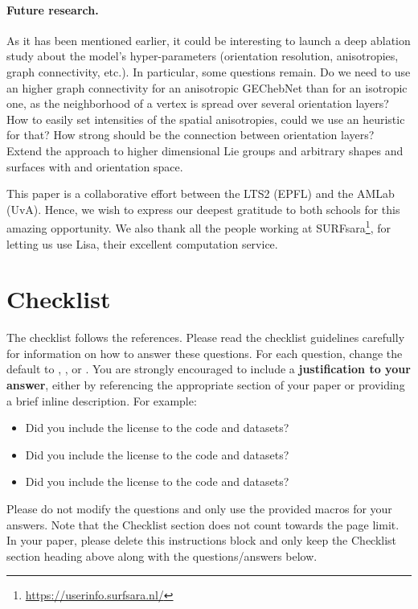 \documentclass{article}
\newcommand{\haguettaz}[1]{{\color[rgb]{.8,.3,.2}{#1}}}
\begin{document}
\paragraph{Future research.} As it has been mentioned earlier, it could be interesting to launch a deep ablation study about the model's hyper-parameters (orientation resolution, anisotropies, graph connectivity, etc.). In particular, some questions remain. Do we need to use an higher graph connectivity for an anisotropic GEChebNet than for an isotropic one, as the neighborhood of a vertex is spread over several orientation layers? How to easily set intensities of the spatial anisotropies, could we use an heuristic for that? How strong should be the connection between orientation layers? Extend the approach to higher dimensional Lie groups and arbitrary shapes and surfaces with and orientation space.

\haguettaz{convergence of graph laplacian to anisotropic Laplace Beltrami operator?}


\begin{ack}
This paper is a collaborative effort between the LTS2 (EPFL) and the AMLab (UvA). Hence, we wish to express our deepest gratitude to both schools for this amazing opportunity. We also thank all the people working at SURFsara\footnote{\url{https://userinfo.surfsara.nl/}}, for letting us use Lisa, their excellent computation service. 
\end{ack}

\clearpage



\clearpage
\section*{Checklist}

The checklist follows the references.  Please
read the checklist guidelines carefully for information on how to answer these
questions.  For each question, change the default \answerTODO{} to \answerYes{},
\answerNo{}, or \answerNA{}.  You are strongly encouraged to include a {\bf
justification to your answer}, either by referencing the appropriate section of
your paper or providing a brief inline description.  For example:
\begin{itemize}
  \item Did you include the license to the code and datasets? 
  \item Did you include the license to the code and datasets? 
  \item Did you include the license to the code and datasets? \answerNA{}
\end{itemize}
Please do not modify the questions and only use the provided macros for your
answers.  Note that the Checklist section does not count towards the page
limit.  In your paper, please delete this instructions block and only keep the
Checklist section heading above along with the questions/answers below.
\end{document}
